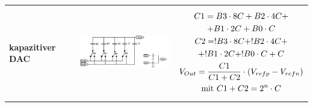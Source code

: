 \begin{longtable}{|l|l|l|}
\begin{minipage}{8cm}
\end{minipage}
\\
\hline

\begin{minipage}{4cm}
\textbf{kapazitiver DAC}
\end{minipage}
&
\begin{minipage}{6cm}
\includegraphics[width=6cm, height = 3.5cm]{pictures/kapazitiverDAC}
\end{minipage}
&
\begin{minipage}{8cm}
\begin{gather}
C1=B3\cdot 8C+B2\cdot 4C+\notag\\+B1\cdot 2C+B0\cdot C\\
C2=!B3\cdot 8C+!B2\cdot 4C+\notag\\+!B1\cdot 2C+!B0\cdot C+C\\
V_{Out}=\frac{C1}{C1+C2}\cdot (V_{refp}-V_{refn})\\
\text{mit } C1+C2=2^n\cdot C
\end{gather}

\end{minipage}
\\
\hline
\end{longtable}

